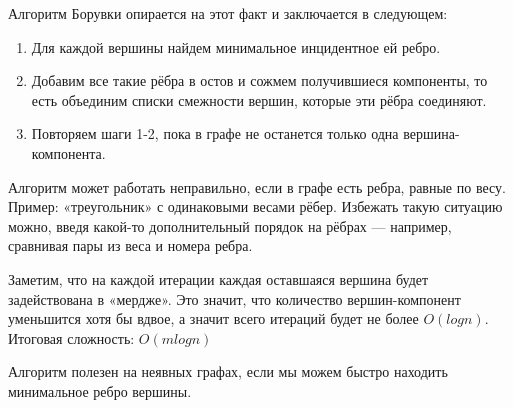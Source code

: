 Алгоритм Борувки опирается на этот факт и заключается в следующем:
\begin{enumerate}
    \item Для каждой вершины найдем минимальное инцидентное ей ребро.
    \item Добавим все такие рёбра в остов и сожмем получившиеся компоненты, то есть объединим списки смежности вершин, которые эти рёбра соединяют.
    \item Повторяем шаги 1-2, пока в графе не останется только одна вершина-компонента.
\end{enumerate}

Алгоритм может работать неправильно, если в графе есть ребра, равные по весу. Пример: «треугольник» с одинаковыми весами рёбер. Избежать такую ситуацию можно, введя какой-то дополнительный порядок на рёбрах — например, сравнивая пары из веса и номера ребра.

Заметим, что на каждой итерации каждая оставшаяся вершина будет задействована в «мердже». Это значит, что количество вершин-компонент уменьшится хотя бы вдвое, а значит всего итераций будет не более $O(log{n})$.
Итоговая сложность: $O(m log{n})$

Алгоритм полезен на неявных графах, если мы можем быстро находить минимальное ребро вершины.
